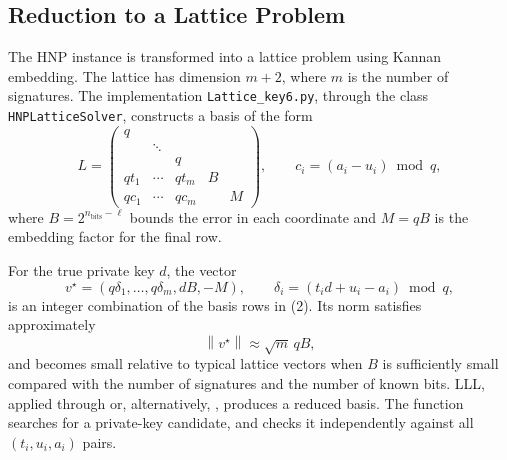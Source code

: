 \documentclass[11pt,a4paper]{article}
\newcommand{\norm}[1]{\left\lVert #1\right\rVert}
\begin{document}
\subsection{Reduction to a Lattice Problem}

The HNP instance is transformed into a lattice problem using Kannan embedding. The lattice has dimension $m+2$, where $m$ is the number of signatures. The implementation \texttt{Lattice\_key6.py}, through the class \texttt{HNPLatticeSolver}, constructs a basis of the form
\[
L=
\begin{pmatrix}
q & & & &\\
&\ddots&&&\\
&&q&&\\
qt_1&\cdots&qt_m&B&\\
qc_1&\cdots&qc_m&&M
\end{pmatrix},
\qquad
c_i=(a_i-u_i)\bmod q,
\tag{2}
\]
where $B=2^{n_{\mathrm{bits}}-\ell}$ bounds the error in each coordinate and $M=qB$ is the embedding factor for the final row.

For the true private key $d$, the vector
\[
v^\star=
(q\delta_1,\ldots,q\delta_m,dB,-M),
\qquad
\delta_i=(t_i d+u_i-a_i)\bmod q,
\]
is an integer combination of the basis rows in (2). Its norm satisfies approximately
\[
\norm{v^\star}\approx \sqrt{m}\,qB,
\]
and becomes small relative to typical lattice vectors when $B$ is sufficiently small compared with the number of signatures and the number of known bits. LLL, applied through  or, alternatively, , produces a reduced basis. The function  searches for a private-key candidate, and  checks it independently against all $(t_i,u_i,a_i)$ pairs.

\begin{figure}[H]
\centering
{}
\end{figure}
\end{document}
